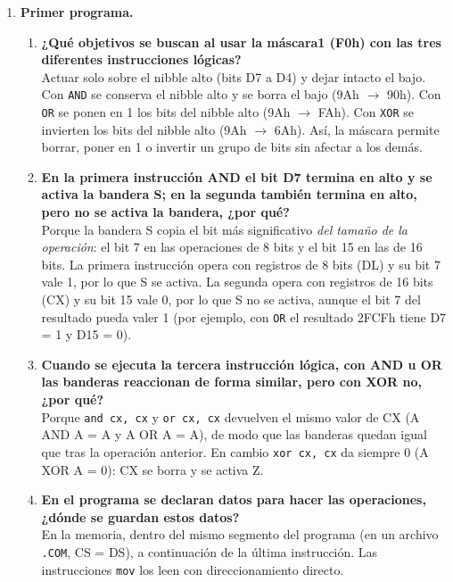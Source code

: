 \documentclass[10pt]{article}
\begin{document}
\begin{enumerate}
  \renewcommand{\labelenumi}{\alph{enumi})}
  \renewcommand{\labelenumii}{\arabic{enumii}.}
 
  \item \textbf{Primer programa.}
  \begin{enumerate}
    \item \textbf{¿Qué objetivos se buscan al usar la máscara1 (F0h) con las tres diferentes instrucciones lógicas?}\\
    Actuar solo sobre el nibble alto (bits D7 a D4) y dejar intacto el bajo. Con \texttt{AND} se conserva el nibble alto y se borra el bajo (9Ah $\rightarrow$ 90h). Con \texttt{OR} se ponen en 1 los bits del nibble alto (9Ah $\rightarrow$ FAh). Con \texttt{XOR} se invierten los bits del nibble alto (9Ah $\rightarrow$ 6Ah). Así, la máscara permite borrar, poner en 1 o invertir un grupo de bits sin afectar a los demás.
 
    \item \textbf{En la primera instrucción AND el bit D7 termina en alto y se activa la bandera S; en la segunda también termina en alto, pero no se activa la bandera, ¿por qué?}\\
    Porque la bandera S copia el bit más significativo \emph{del tamaño de la operación}: el bit 7 en las operaciones de 8 bits y el bit 15 en las de 16 bits. La primera instrucción opera con registros de 8 bits (DL) y su bit 7 vale 1, por lo que S se activa. La segunda opera con registros de 16 bits (CX) y su bit 15 vale 0, por lo que S no se activa, aunque el bit 7 del resultado pueda valer 1 (por ejemplo, con \texttt{OR} el resultado 2FCFh tiene D7 = 1 y D15 = 0).
 
    \item \textbf{Cuando se ejecuta la tercera instrucción lógica, con AND u OR las banderas reaccionan de forma similar, pero con XOR no, ¿por qué?}\\
    Porque \texttt{and cx, cx} y \texttt{or cx, cx} devuelven el mismo valor de CX (A AND A = A y A OR A = A), de modo que las banderas quedan igual que tras la operación anterior. En cambio \texttt{xor cx, cx} da siempre 0 (A XOR A = 0): CX se borra y se activa Z.
 
    \item \textbf{En el programa se declaran datos para hacer las operaciones, ¿dónde se guardan estos datos?}\\
    En la memoria, dentro del mismo segmento del programa (en un archivo \texttt{.COM}, CS = DS), a continuación de la última instrucción. Las instrucciones \texttt{mov} los leen con direccionamiento directo.
  \end{enumerate}
 

\end{enumerate}
\end{document}
